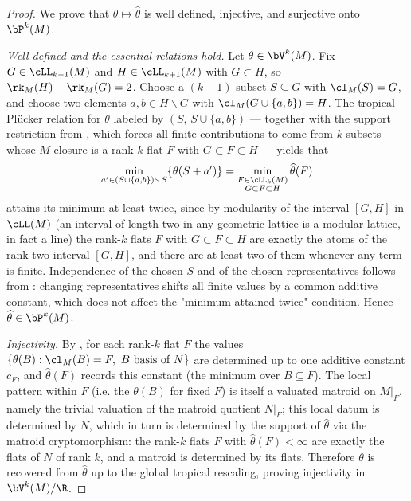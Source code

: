 \begin{proof}
We prove that $\theta\mapsto\widehat\theta$ is well defined, injective, and
surjective onto $\bP^k(M)$.

\emph{Well-defined and the essential relations hold.}
Let $\theta\in\bV^k(M)$. Fix $G\in\cLL_{k-1}(M)$ and $H\in\cLL_{k+1}(M)$ with
$G\subset H$, so $\rk_M(H)-\rk_M(G)=2$. Choose a $(k-1)$-subset
$S\subseteq G$ with $\cl_M(S)=G$, and choose two elements
$a,b\in H\smallsetminus G$ with $\cl_M(G\cup\{a,b\})=H$. The tropical Pl\"ucker
relation for $\theta$ labeled by $(S,\,S\cup\{a,b\})$ — together with the support
restriction from , which forces all finite contributions
to come from $k$-subsets whose $M$-closure is a rank-$k$ flat $F$ with
$G\subset F\subset H$ — yields that
\[
\min_{a'\in (S\cup\{a,b\})\smallsetminus S}\{\theta(S+a')\}
=\min_{\substack{F\in\cLL_k(M)\\ G\subset F\subset H}}\widehat\theta(F)
\]
attains its minimum at least twice, since by modularity of the interval
$[G,H]$ in $\cLL(M)$ (an interval of length two in any geometric lattice is a
modular lattice, in fact a line) the rank-$k$ flats $F$ with $G\subset F\subset
H$ are exactly the atoms of the rank-two interval $[G,H]$, and there are at least
two of them whenever any term is finite. Independence of the chosen $S$ and of
the chosen representatives follows from : changing
representatives shifts all finite values by a common additive constant, which
does not affect the "minimum attained twice" condition. Hence
$\widehat\theta\in\bP^k(M)$.

\emph{Injectivity.}
By , for each rank-$k$ flat $F$ the values
$\{\theta(B): \cl_M(B)=F,\ B\text{ basis of }N\}$ are determined up to one
additive constant $c_F$, and $\widehat\theta(F)$ records this constant
(the minimum over $B\subseteq F$). The local pattern within $F$ (i.e. the
$\theta(B)$ for fixed $F$) is itself a valuated matroid on $M|_F$, namely the
trivial valuation of the matroid quotient $N|_F$; this local datum is determined
by $N$, which in turn is determined by the support of $\widehat\theta$ via the
matroid cryptomorphism: the rank-$k$ flats $F$ with $\widehat\theta(F)<\infty$
are exactly the flats of $N$ of rank $k$, and a matroid is determined by its
flats. Therefore $\theta$ is recovered from $\widehat\theta$ up to the global
tropical rescaling, proving injectivity in $\bV^k(M)/\R$.


\end{proof}
